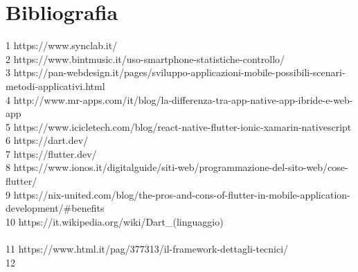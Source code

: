 

\cleardoublepage
\chapter{Bibliografia}

\nocite{*}
\printbibliography[heading=subbibliography,title={Riferimenti bibliografici},type=book]

\printbibliography[heading=subbibliography,title={Siti web consultati},type=online]

1 https://www.synclab.it/
\\
2 https://www.bintmusic.it/uso-smartphone-statistiche-controllo/
\\
3 https://pan-webdesign.it/pages/sviluppo-applicazioni-mobile-possibili-scenari-metodi-applicativi.html
\\
4 http://www.mr-apps.com/it/blog/la-differenza-tra-app-native-app-ibride-e-web-app
\\
5 https://www.icicletech.com/blog/react-native-flutter-ionic-xamarin-nativescript
\\
6 https://dart.dev/
\\
7 https://flutter.dev/
\\
8 https://www.ionos.it/digitalguide/siti-web/programmazione-del-sito-web/cose-flutter/
\\
9 https://nix-united.com/blog/the-pros-and-cons-of-flutter-in-mobile-application-development/\#benefits
\\
10 https://it.wikipedia.org/wiki/Dart\_(linguaggio)\\
\\
11 
https://www.html.it/pag/377313/il-framework-dettagli-tecnici/
\\
12








